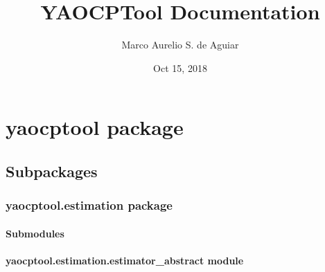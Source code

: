 \documentclass[letterpaper,10pt,english]{sphinxmanual}
\title{YAOCPTool Documentation}
\date{Oct 15, 2018}
\author{Marco Aurelio S. de Aguiar}
\begin{document}
\pagestyle{empty}
\maketitle
\pagestyle{plain}
\sphinxtableofcontents
\pagestyle{normal}
\label{\detokenize{index::doc}}



\chapter{yaocptool package}
\label{\detokenize{yaocptool:yaocptool-package}}\label{\detokenize{yaocptool::doc}}

\section{Subpackages}
\label{\detokenize{yaocptool:subpackages}}

\subsection{yaocptool.estimation package}
\label{\detokenize{yaocptool.estimation:yaocptool-estimation-package}}\label{\detokenize{yaocptool.estimation::doc}}

\subsubsection{Submodules}
\label{\detokenize{yaocptool.estimation:submodules}}

\subsubsection{yaocptool.estimation.estimator\_abstract module}
\label{\detokenize{yaocptool.estimation:module-yaocptool.estimation.estimator_abstract}}\label{\detokenize{yaocptool.estimation:yaocptool-estimation-estimator-abstract-module}}
\end{document}
